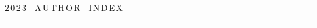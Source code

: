 

\def\leftfootline{\small{\textbf{\thepage}


\hfill ИНФОРМАТИКА И ЕЁ ПРИМЕНЕНИЯ\ \ \ том~17\ \ \ выпуск~4\ \ \ 2023}


}%


 \def\rightfootline{\small{ИНФОРМАТИКА И ЕЁ ПРИМЕНЕНИЯ\ \ \ том~17\ \ \ выпуск~4\ \ \ 2023


 \hfill \textbf{\thepage}}}





 \label{end\stat}





\newpage





\def\stat{cont-e}


{%




\raggedleft\Large \bf%


2\,0\,2\,3\ \ A\,U\,T\,H\,O\,R\ \ I\,N\,D\,E\,X \vskip 17pt


 \hrule


 \par


 }





\label{st\stat}





\def\tit{\ }





\def\aut{\ }


\def\auf{\ }





\def\leftkol{\ } %





\def\rightkol{\ } %





\titele{\tit}{\aut}{\auf}{\leftkol}{\rightkol}








